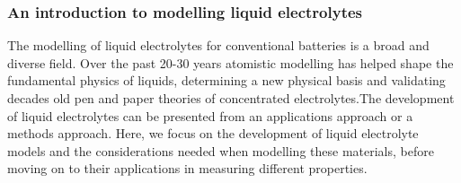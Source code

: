 \documentclass[../main.tex]{subfiles}
\begin{document}



\subsubsection{An introduction to modelling liquid electrolytes}
The modelling of liquid electrolytes for conventional batteries is a broad and diverse field. Over the past 20-30 years atomistic modelling has helped shape the fundamental physics of liquids, determining a new physical basis and validating decades old pen and paper theories of concentrated electrolytes.The development of liquid electrolytes can be presented from an applications approach or a methods approach. Here, we focus on the development of liquid electrolyte models and the considerations needed when modelling these materials, before moving on to their applications in measuring different properties.
\end{document}
